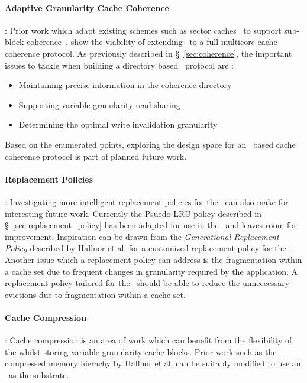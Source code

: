 \paragraph{Adaptive Granularity Cache Coherence}: Prior work which adapt existing schemes such as sector caches~\cite{Rothman_Smith_2000} to support sub-block coherence~\cite{Subblock_Coherence,minerva}, show the viability of extending \AC\ to a full multicore cache coherence protocol. As previously described in \S~\ref{sec:coherence}, the important issues to tackle when building a directory based \AC\ protocol are :
\begin{itemize}[noitemsep]
	\item Maintaining precise information in the coherence directory
	\item Supporting variable granularity read sharing
	\item Determining the optimal write invalidation granularity
\end{itemize}
Based on the enumerated points, exploring the design space for an \AC\ based cache coherence protocol is part of planned future work. 

\paragraph{Replacement Policies}: Investigating more intelligent replacement policies for the \AC\ can also make for interesting future work. Currently the Psuedo-LRU policy described in \S~\ref{sec:replacement_policy} has been adapted for use in the \AC\ and leaves room for improvement. Inspiration can be drawn from the \textit{Generational Replacement Policy} described by Hallnor et al.\cite{Hallnor_Reinhardt_2000} for a customized replacement policy for the \AC{}. Another issue which a replacement policy can address is the fragmentation within a cache set due to frequent changes in granularity required by the application. A replacement policy tailored for the \AC\ should be able to reduce the unneccessary evictions due to fragmentation within a cache set.

\paragraph{Cache Compression}: Cache compression is an area of work which can benefit from the flexibility of the \AC{} whilst storing variable granularity cache blocks. Prior work such as the compressed memory hierachy by Hallnor et al.\cite{Hallnor04acompressed} can be suitably modified to use an \AC\ as the substrate.

